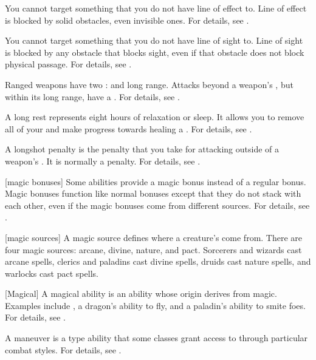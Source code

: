  You cannot target something that you do not have line of effect to.
Line of effect is blocked by solid obstacles, even invisible ones.
For details, see .

 You cannot target something that you do not have line of sight to.
Line of sight is blocked by any obstacle that blocks sight, even if that obstacle does not block physical passage.
For details, see .

 Ranged weapons have two :  and long range.
Attacks beyond a weapon's , but within its long range, have a  .
For details, see .

 A long rest represents eight hours of relaxation or sleep.
It allows you to remove all of your  and make progress towards healing a .
For details, see .

 A longshot penalty is the penalty that you take for attacking outside of a weapon's .
It is normally a   penalty.
For details, see .

[magic bonuses] Some abilities provide a magic bonus instead of a regular bonus.
Magic bonuses function like normal bonuses except that they do not stack with each other, even if the magic bonuses come from different sources.
For details, see .

[magic sources] A magic source defines where a creature's  come from.
There are four magic sources: arcane, divine, nature, and pact.
Sorcerers and wizards cast arcane spells, clerics and paladins cast divine spells, druids cast nature spells, and warlocks cast pact spells.

[Magical] A magical ability is an ability whose origin derives from magic.
Examples include , a dragon's ability to fly, and a paladin's ability to smite foes.
For details, see .

 A maneuver is a type  ability that some classes grant access to through particular combat styles.
For details, see .

